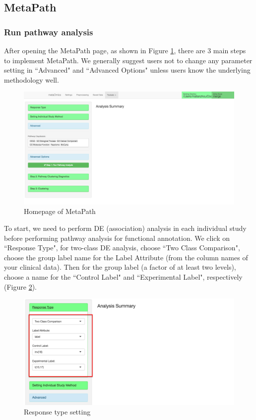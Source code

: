 \subsection{MetaPath}
\subsubsection{Run pathway analysis}

After opening the MetaPath page, as shown in Figure \ref{fig:MetaPathmainpage}, there are 3 main steps to implement MetaPath. We generally suggest users not to change any parameter setting in ``Advanced"  and ``Advanced Options" unless users know the underlying methodology well. 

\begin{figure}[H]
\begin{center}
\includegraphics[scale=0.35]{./figure/metaPath/MetaPathmainpage}
\caption{Homepage of MetaPath}
\label{fig:MetaPathmainpage}
\end{center}
\end{figure}

To start, we need to perform DE (association) analysis in each individual study before performing pathway analysis for functional annotation. We click on ``Response Type", for two-class DE analysis, choose ``Two Class Comparison", choose the group label name for the Label Attribute (from the column names of your clinical data). Then for the group label (a factor of at least two levels), choose a name for the ``Control Label" and ``Experimental Label", respectively (Figure \ref{fig:ResponseType}).

\begin{figure}[H]
\begin{center}
\includegraphics[scale=0.4]{./figure/metaPath/ResponseType}
\caption{Response type setting}
\label{fig:ResponseType}
\end{center}
\end{figure}

